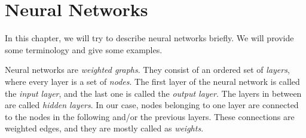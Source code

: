 \section{Neural Networks}
In this chapter, we will try to describe neural networks briefly. We will provide some terminology and give some examples. 

Neural networks are \textit{weighted graphs}. They consist of an ordered set of \textit{layers}, where every layer is a set of \textit{nodes}. The first layer of the neural network is called the \textit{input layer}, and the last one is called the \textit{output layer}. The layers in between are called \textit{hidden layers}. In our case, nodes belonging to one layer are connected to the nodes in the following and/or the previous layers. These connections are weighted edges, and they are mostly called as \textit{weights}. 

